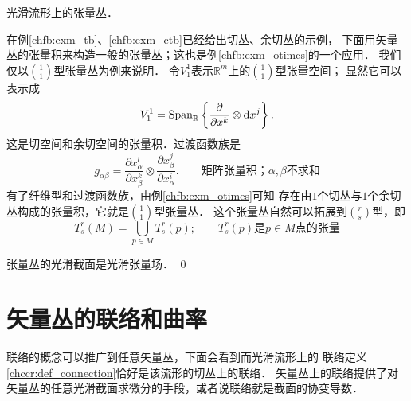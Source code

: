 \begin{example}\label{chfb:exm_tensor-bundles}
    光滑流形上的张量丛．
\end{example}
在例\ref{chfb:exm_tb}、\ref{chfb:exm_ctb}已经给出切丛、余切丛的示例，
下面用矢量丛的张量积来构造一般的张量丛；这也是例\ref{chfb:exm_otimes}的一个应用．
我们仅以$\binom{1}{1}$型张量丛为例来说明．
令$V^1_1$表示$\mathbb{R}^m$上的$\binom{1}{1}$型张量空间；
显然它可以表示成
\begin{equation*}
    V^1_1 = {\rm Span}_{\mathbb{R}}\left\{  \frac{\partial}{\partial x^k}\otimes {\rm d}x^j \right\} .
\end{equation*}
这是切空间和余切空间的张量积．过渡函数族是
\begin{equation*}
    g_{\alpha\beta} = \frac{\partial {x}^l_\alpha}{\partial {x}^k_\beta} \otimes
    \frac{\partial {x}^j_\beta}{\partial {x}^i_\alpha}  .
    \qquad \text{矩阵张量积；}\alpha,\beta \text{不求和}
\end{equation*}
有了纤维型和过渡函数族，由例\ref{chfb:exm_otimes}可知
存在由$1$个切丛与$1$个余切丛构成的张量积，它就是$\binom{1}{1}$型张量丛．
这个张量丛自然可以拓展到$\binom{r}{s}$型，即
\begin{equation*}
    T_s^r(M)=\bigcup_{p \in M} T_s^r(p); \qquad
    T_s^r(p)\text{是}p\in M\text{点的张量}
\end{equation*}


张量丛的光滑截面是光滑张量场．
\qed








\section{矢量丛的联络和曲率}\label{chfb:sec_connection}

联络的概念可以推广到任意矢量丛，下面会看到而光滑流形上的
联络定义\ref{chccr:def_connection}恰好是该流形的切丛上的联络．
矢量丛上的联络提供了对矢量丛的任意光滑截面求微分的手段，或者说联络就是截面的协变导数．


